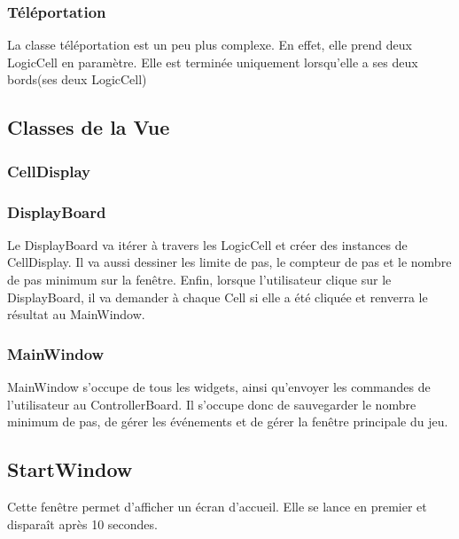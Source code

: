 \documentclass[utf8]{article}
\begin{document}
\begin{large}
\subsubsection{Téléportation}
\par
\indent
La classe téléportation est un peu plus complexe. En effet, elle prend deux
LogicCell en paramètre. Elle est terminée uniquement lorsqu'elle a ses deux bords(ses deux LogicCell)
\par

\subsection{Classes de la Vue}
\subsubsection{CellDisplay}
\par
\indent

\par
\subsubsection{DisplayBoard}
\par
\indent
Le DisplayBoard va itérer à travers les LogicCell et créer des instances de
CellDisplay. Il va aussi dessiner les limite de pas, le compteur de pas et le
nombre de pas minimum sur la fenêtre. Enfin, lorsque l'utilisateur clique sur le
DisplayBoard, il va demander à chaque Cell si elle a été cliquée et renverra le
résultat au MainWindow.
\par
\subsubsection{MainWindow}
\par
\indent
MainWindow s'occupe de tous les widgets, ainsi qu'envoyer les commandes de
l'utilisateur au ControllerBoard. Il s'occupe donc de sauvegarder le nombre
minimum de pas, de gérer les événements et de gérer la fenêtre principale du
jeu.
\par
\subsection{StartWindow}
\par
\indent
Cette fenêtre permet d'afficher un écran d'accueil. Elle se lance en premier et
disparaît après 10 secondes.
\par



\end{large}
\end{document}
